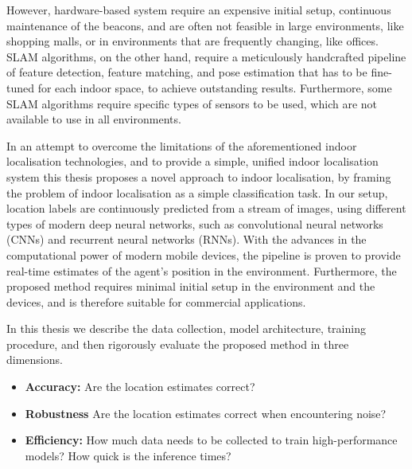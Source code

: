 \documentclass[a4paper]{article}
\begin{document}
  However, hardware-based system require an expensive initial setup, continuous
  maintenance of the beacons, and are often not feasible in large environments,
  like shopping malls, or in environments that are frequently changing, like
  offices. SLAM algorithms, on the other hand, require a meticulously
  handcrafted pipeline of feature detection, feature matching, and pose
  estimation that has to be fine-tuned for each indoor space, to achieve
  outstanding results. Furthermore, some SLAM algorithms require specific types
  of sensors to be used, which are not available to use in all environments.


  In an attempt to overcome the limitations of the aforementioned indoor
  localisation technologies, and to provide a simple, unified indoor
  localisation system this thesis proposes a novel approach to indoor
  localisation, by framing the problem of indoor localisation as a simple
  classification task. In our setup, location labels are continuously predicted
  from a stream of images, using different types of modern deep neural networks,
  such as convolutional neural networks (CNNs) and recurrent neural networks
  (RNNs). With the advances in the computational power of modern mobile devices,
  the pipeline is proven to provide real-time estimates of the agent's position
  in the environment. Furthermore, the proposed method requires minimal initial
  setup in the environment and the devices, and is therefore suitable for
  commercial applications.

  In this thesis we describe the data collection, model architecture, training
  procedure, and then rigorously evaluate the proposed method in three
  dimensions.

  \begin{itemize}
    \item \textbf{Accuracy:} Are the location estimates correct? 
    \item \textbf{Robustness} Are the location estimates correct when
      encountering noise?
    \item \textbf{Efficiency:} How much data needs to be collected to train
      high-performance models? How quick is the inference times?
  \end{itemize} 
\end{document}
